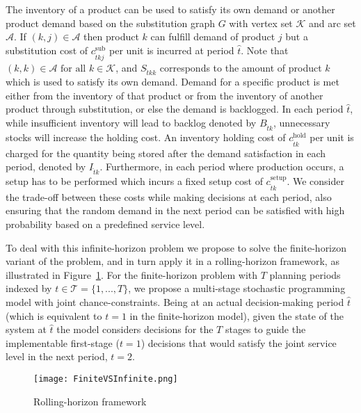 \documentclass[10pt]{article}
\newcommand{\ti}{t} %
\newcommand{\TI}{\mathcal{T}}
\newcommand{\Ti}{T}
\newcommand{\ka}{k} %
\newcommand{\KA}{\mathcal{K}}
\newcommand{\jey}{j} %
\newcommand{\Graf}{\mathcal{A}} %
\newcommand{\Bi}{B} %
\newcommand{\tAct}{\hat{\ti}} %
\begin{document}
The inventory of a product can be used to satisfy its own demand or another product demand based on the substitution graph $G$ with vertex set $\KA$ and arc set $\Graf$. If $(\ka, \jey) \in \Graf$ then product $\ka$  can fulfill demand of product $\jey$ but a substitution cost of $c^{\text{sub}}_{\tAct \ka \jey }$ per unit is incurred at period $\tAct$. Note that $(\ka, \ka) \in \Graf  \text{ for all } \ka \in \KA$, and $S_{\tAct \ka \ka}$ corresponds to the amount of product $\ka$ which is used to satisfy its own demand.  Demand for a specific product is met either from the inventory of that product or from the inventory of another product through substitution, or else the demand is backlogged. In each period $\tAct$, while insufficient inventory will lead to backlog denoted by $\Bi_{\tAct \ka}$, unnecessary stocks will increase the holding cost. An inventory holding cost of $c^{\text{hold}}_{\tAct \ka}$ per unit is charged for the quantity being stored after the demand satisfaction in each period, denoted by $I_{\tAct \ka}$. Furthermore, in each period where production occurs, a setup has to be performed which incurs a fixed setup cost of $c^{\text{setup}}_{\tAct \ka}$. We consider the trade-off between these costs while making decisions at each period, also ensuring that the random demand in the next period can be satisfied with high probability based on a predefined service level. 

To deal with this infinite-horizon problem we propose to solve the finite-horizon variant of the problem, and in turn apply it in a rolling-horizon framework, as illustrated in Figure~\ref{fig:FiniteVSInfinite}.
For the finite-horizon problem with $\Ti$ planning periods indexed by $\ti \in \TI=\{1 , ..., \Ti\}$, we propose a multi-stage stochastic programming model with joint chance-constraints. 
Being at an actual decision-making period $\tAct$ (which is equivalent to $t=1$ in the finite-horizon model), given the state of the system at $\tAct$ the model considers decisions for the $\Ti$ stages to guide the implementable first-stage ($\ti =1$) decisions that would satisfy the joint service level in the next period, $\ti=2$.



\begin{figure}[!h]
\begin{center}
\texttt{[image: FiniteVSInfinite.png]}
\caption{Rolling-horizon framework} 
\label{fig:FiniteVSInfinite}
\end{center}
\end{figure}
\end{document}
